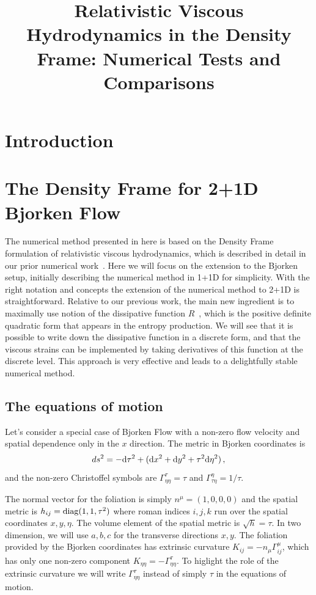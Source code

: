 \documentclass[12pt,aps,preprint,nofootinbib,noshowkeys,noshowpacs,longbibliography,superscriptaddress,tightenlines]{revtex4-2}
\def\st{\begin{equation}}
\def\stp{\end{equation}}
\def\dd{{\rm d}}
\begin{document}
\preprint{}
 
\title{Relativistic Viscous Hydrodynamics in the Density Frame: Numerical Tests and Comparisons}

\section{Introduction} 


\section{The Density Frame for 2+1D Bjorken Flow}
\label{sec:densityframe}

The numerical method presented in here is based on the Density Frame formulation of relativistic viscous hydrodynamics, which is described in detail in our prior numerical work~\cite{Numerics1D}.   Here we will 
focus on the extension to the Bjorken setup, initially describing 
the numerical method in 1+1D for simplicity. With the right notation and concepts the extension of the numerical method to 2+1D is straightforward. 
Relative to our previous work, the main new ingredient is to maximally use notion of the dissipative function $R$~\cite{}, which is the positive definite quadratic form that appears in the entropy production.  We will see that 
it is possible to write down the dissipative function in a discrete form, and that the viscous strains can be implemented by taking derivatives of this function at the discrete level.  This approach is very effective and leads to a delightfully stable numerical method.

\subsection{The equations of motion}

Let's consider a special case of Bjorken Flow with a non-zero flow velocity and spatial dependence only 
in the $x$ direction.
The metric in Bjorken coordinates is 
\st
   ds^2 = - \dd\tau^2 + (\dd x^2 + \dd y^2 + \tau^2 \dd\eta^2) \, ,
\stp
and the non-zero Christoffel symbols are $\Gamma^\tau_{\eta\eta} = \tau$ and
$\Gamma^\eta_{\tau\eta} = 1/\tau$.  

The normal vector for the foliation is simply $n^{\mu}=(1, 0, 0, 0)$
and the spatial metric is $h_{ij} = {\rm diag}(1, 1, \tau^2)$ where roman indices $i,j,k$ run over the spatial coordinates $x, y, \eta$. 
The volume element
of the spatial metric is $\sqrt{h} = \tau$. 
In two dimension,  we will use $a,b,c$ for the transverse directions  $x,y$.
The foliation provided by the Bjorken
coordinates has extrinsic curvature $K_{ij} =  -n_{\mu }\Gamma^{\mu}_{ij} $,
which has only one non-zero component $K_{\eta\eta} = -\Gamma^{\tau}_{\eta\eta}$.  To higlight the role of the extrinsic curvature we will write $\Gamma^{\tau}_{\eta\eta}$ instead of simply $\tau$ in the equations of motion.
\end{document}
